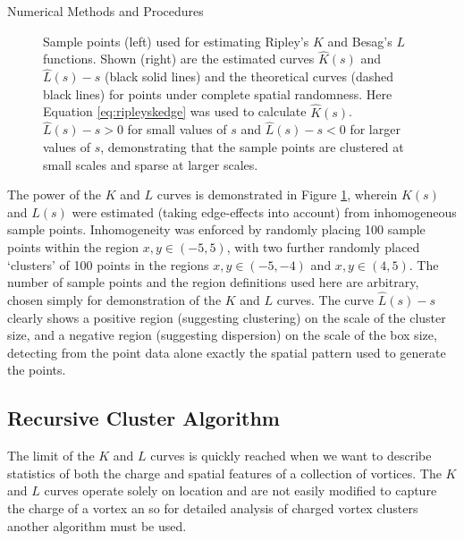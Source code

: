 \begin{chapter}{\label{cha:numerics}Numerical Methods and Procedures}
\begin{figure}[!ht]
\begin{minipage}{0.5\linewidth}
%
  \end{minipage}%
  \caption{Sample points (left) used for estimating Ripley's $K$ and Besag's $L$ functions. Shown (right) are the estimated curves $\hat{K}(s)$ and $\hat{L}(s)-s$ (black solid lines) and the theoretical curves (dashed black lines) for points under complete spatial randomness. Here Equation \ref{eq:ripleyskedge} was used to calculate $\hat K(s)$. $\hat{L}(s)-s > 0$ for small values of $s$ and $\hat{L}(s)-s < 0$ for larger values of $s$, demonstrating that the sample points are clustered at small scales and sparse at larger scales.\label{fig:ripleyexample}}
 \end{figure}

  The power of the $K$ and $L$ curves is demonstrated in Figure \ref{fig:ripleyexample}, wherein $K(s)$ and $L(s)$ were estimated (taking edge-effects into account) from inhomogeneous sample points. Inhomogeneity was enforced by randomly placing 100 sample points within the region $x,y \in (-5,5)$, with two further randomly placed `clusters' of 100 points in the regions $x,y \in (-5,-4)$ and $x,y \in (4,5)$. The number of sample points and the region definitions used here are arbitrary, chosen simply for demonstration of the $K$ and $L$ curves. The curve $\hat{L}(s)-s$ clearly shows a positive region (suggesting clustering) on the scale of the cluster size, and a negative region (suggesting dispersion) on the scale of the box size, detecting from the point data alone exactly the spatial pattern used to generate the points.

  
\subsection{\label{section:reevesalgorithm} Recursive Cluster Algorithm }
The limit of the $K$ and $L$ curves is quickly reached when we want to describe statistics of both the charge and spatial features of a collection of vortices. The $K$ and $L$ curves operate solely on location and are not easily modified to capture the charge of a vortex an so for detailed analysis of charged vortex clusters another algorithm must be used.


\end{chapter}
